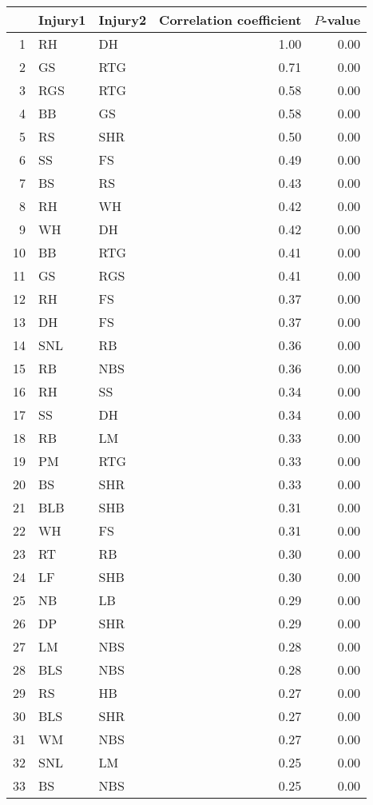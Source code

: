 \begin{table}[ht]
\centering
\begin{tabular}{rllrr}
  \hline
 & Injury1 & Injury2 & Correlation coefficient & $P$-value \\ 
  \hline
1 & RH & DH & 1.00 & 0.00 \\ 
  2 & GS & RTG & 0.71 & 0.00 \\ 
  3 & RGS & RTG & 0.58 & 0.00 \\ 
  4 & BB & GS & 0.58 & 0.00 \\ 
  5 & RS & SHR & 0.50 & 0.00 \\ 
  6 & SS & FS & 0.49 & 0.00 \\ 
  7 & BS & RS & 0.43 & 0.00 \\ 
  8 & RH & WH & 0.42 & 0.00 \\ 
  9 & WH & DH & 0.42 & 0.00 \\ 
  10 & BB & RTG & 0.41 & 0.00 \\ 
  11 & GS & RGS & 0.41 & 0.00 \\ 
  12 & RH & FS & 0.37 & 0.00 \\ 
  13 & DH & FS & 0.37 & 0.00 \\ 
  14 & SNL & RB & 0.36 & 0.00 \\ 
  15 & RB & NBS & 0.36 & 0.00 \\ 
  16 & RH & SS & 0.34 & 0.00 \\ 
  17 & SS & DH & 0.34 & 0.00 \\ 
  18 & RB & LM & 0.33 & 0.00 \\ 
  19 & PM & RTG & 0.33 & 0.00 \\ 
  20 & BS & SHR & 0.33 & 0.00 \\ 
  21 & BLB & SHB & 0.31 & 0.00 \\ 
  22 & WH & FS & 0.31 & 0.00 \\ 
  23 & RT & RB & 0.30 & 0.00 \\ 
  24 & LF & SHB & 0.30 & 0.00 \\ 
  25 & NB & LB & 0.29 & 0.00 \\ 
  26 & DP & SHR & 0.29 & 0.00 \\ 
  27 & LM & NBS & 0.28 & 0.00 \\ 
  28 & BLS & NBS & 0.28 & 0.00 \\ 
  29 & RS & HB & 0.27 & 0.00 \\ 
  30 & BLS & SHR & 0.27 & 0.00 \\ 
  31 & WM & NBS & 0.27 & 0.00 \\ 
  32 & SNL & LM & 0.25 & 0.00 \\ 
  33 & BS & NBS & 0.25 & 0.00 \\ 

\end{tabular}
\end{table}
